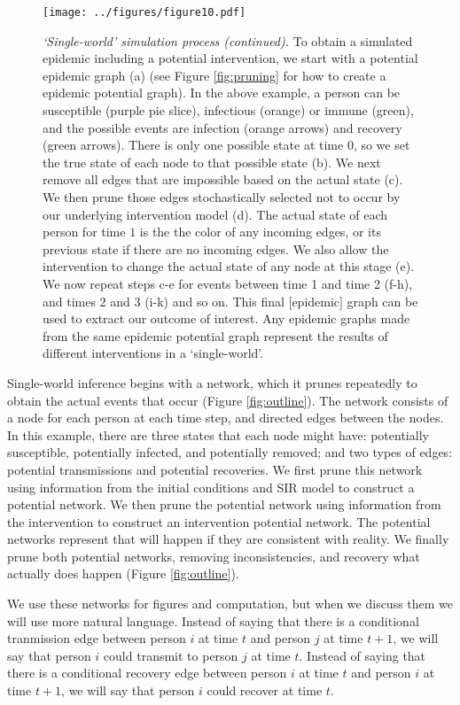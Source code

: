 \documentclass[PTRSB]{rsos}
\makeatletter
\def\checkGraphicsWidth{\ifdim\Gin@nat@width>\linewidth
	\tsGraphicsScaleX\linewidth\else\Gin@nat@width\fi}
\let\ts@includegraphics\includegraphics
\renewcommand{\includegraphics}[1]{\ts@includegraphics[width=\checkGraphicsWidth]{#1}}
\makeatother
\begin{document}
\begin{multicols}{2}
\begin{figure}[hp]
\texttt{[image: ../figures/figure10.pdf]}
\caption{\textit{‘Single-world’ simulation process (continued).}
  To obtain a simulated epidemic including a potential intervention, we start with a potential epidemic graph (a) (see Figure \ref{fig:pruning} for how to create a epidemic potential graph).
  In the above example, a person can be susceptible (purple pie slice), infectious (orange) or immune (green), and the possible events are infection (orange arrows) and recovery (green arrows). %
  There is only one possible state at time $0$, so we set the true state of each node to that possible state (b).
  We next remove all edges that are impossible based on the actual state (c). %
  We then prune those edges stochastically selected not to occur by our underlying intervention model (d).
  The actual state of each person for time $1$ is the the color of any incoming edges, or its previous state if there are no incoming edges.
  We also allow the intervention to change the actual state of any node at this stage (e).
  We now repeat steps c-e for events between time 1 and time 2 (f-h), and times 2 and 3 (i-k) and so on.
  This final [epidemic] graph can be used to extract our outcome of interest.
  Any epidemic graphs made from the same epidemic potential graph represent the results of different interventions in a `single-world'.
}
\label{fig:actualizing}
\end{figure}

Single-world inference begins with a network, which it prunes repeatedly to obtain the actual events that occur (Figure \ref{fig:outline}).
The network consists of a node for each person at each time step, and directed edges between the nodes.
In this example, there are three states that each node might have: potentially susceptible, potentially infected, and potentially removed; and two types of edges: potential transmissions and potential recoveries.
We first prune this network using information from the initial conditions and SIR model to construct a potential network.
We then prune the potential network using information from the intervention to construct an intervention potential network.
The potential networks represent that will happen if they are consistent with reality.
We finally prune both potential networks, removing inconsistencies, and recovery what actually does happen (Figure \ref{fig:outline}).

We use these networks for figures and computation, but when we discuss them we will use more natural language.
Instead of saying that there is a conditional tranmission edge between person $i$ at time $t$ and person $j$ at time $t+1$, we will say that person $i$ could transmit to person $j$ at time $t$.
Instead of saying that there is a conditional recovery edge between person $i$ at time $t$ and person $i$ at time $t+1$, we will say that person $i$ could recover at time $t$.


\end{multicols}
\end{document}

